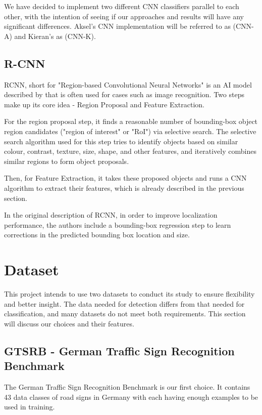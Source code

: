 \documentclass[12pt, landscape]{article}
\begin{document}
\begin{multicols}{3}
We have decided to implement two different CNN classifiers parallel to
each other, with the intention of seeing if our approaches and results will have
any significant differences. Aksel's CNN implementation will be referred to as
(CNN-A) and Kieran's as (CNN-K).

\subsection{R-CNN}
RCNN, short for "Region-based Convolutional Neural Networks" is an AI model
described by \citep[Girshick et al.]{girshick2014rich} that is often used for
cases such as image recognition. Two steps make up its core idea - Region
Proposal and Feature Extraction.

For the region proposal step, it finds a reasonable number of bounding-box
object region candidates ("region of interest" or "RoI") via selective search.
The selective search algorithm used for this step tries to identify objects
based on similar colour, contrast, texture, size, shape, and other features, and
iteratively combines similar regions to form object proposals.

Then, for Feature Extraction, it takes these proposed objects and runs a CNN
algorithm to extract their features, which is already described in the previous
section.

In the original description of RCNN, in order to improve localization
performance, the authors include a bounding-box regression step to learn
corrections in the predicted bounding box location and size.

\section{Dataset}
This project intends to use two datasets to conduct its study to ensure
flexibility and better insight. The data needed for detection differs from that
needed for classification, and many datasets do not meet both requirements. This
section will discuss our choices and their features.
\subsection{GTSRB - German Traffic Sign Recognition Benchmark}
The German Traffic Sign Recognition Benchmark is our first choice. It contains
43 data classes of road signs in Germany with each having enough examples to be
used in training.


\end{multicols}
\end{document}
